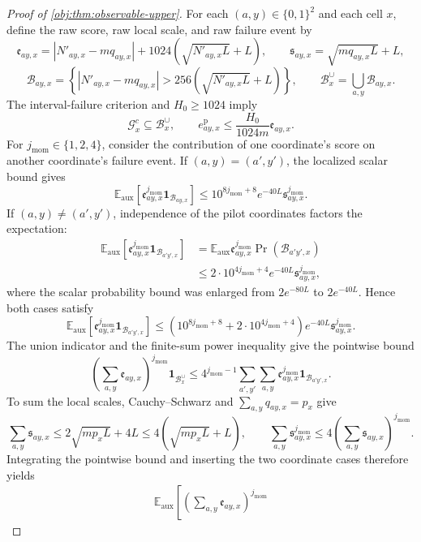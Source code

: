 \begin{proof}[Proof of \cref{obj:thm:observable-upper}]
For each \((a,y)\in\{0,1\}^2\) and each cell \(x\), define the raw score, raw local scale, and raw failure event by
\[
\mathfrak e_{ay,x}
=|N'_{ay,x}-mq_{ay,x}|
+1024\left(\sqrt{N'_{ay,x}L}+L\right),
\qquad
\mathfrak s_{ay,x}=\sqrt{mq_{ay,x}L}+L,
\]
\[
\mathcal B_{ay,x}
=\left\{
|N'_{ay,x}-mq_{ay,x}|>
256\left(\sqrt{N'_{ay,x}L}+L\right)
\right\},
\qquad
\mathcal B_x^{\cup}=\bigcup_{a,y}\mathcal B_{ay,x}.
\]
The interval-failure criterion and \(H_0\ge1024\) imply
\[
\mathcal G_x^c\subseteq\mathcal B_x^{\cup},
\qquad
e_{ay,x}^{\mathrm p}
\le\frac{H_0}{1024m}\mathfrak e_{ay,x}.
\]
For \(j_{\mathrm{mom}}\in\{1,2,4\}\), consider the contribution of one coordinate's score on another coordinate's failure event. If \((a,y)=(a',y')\), the localized scalar bound gives
\[
\mathbb E_{\mathrm{aux}}\!\left[
\mathfrak e_{ay,x}^{j_{\mathrm{mom}}}\mathbf1_{\mathcal B_{ay,x}}
\right]
\le10^{8j_{\mathrm{mom}}+8}e^{-40L}
\mathfrak s_{ay,x}^{j_{\mathrm{mom}}}.
\]
If \((a,y)\ne(a',y')\), independence of the pilot coordinates factors the expectation:
\[
\begin{aligned}
\mathbb E_{\mathrm{aux}}\!\left[
\mathfrak e_{ay,x}^{j_{\mathrm{mom}}}\mathbf1_{\mathcal B_{a'y',x}}
\right]
&=\mathbb E_{\mathrm{aux}}\mathfrak e_{ay,x}^{j_{\mathrm{mom}}}
\Pr(\mathcal B_{a'y',x})\\
&\le2\cdot10^{4j_{\mathrm{mom}}+4}e^{-40L}
\mathfrak s_{ay,x}^{j_{\mathrm{mom}}},
\end{aligned}
\]
where the scalar probability bound was enlarged from \(2e^{-80L}\) to \(2e^{-40L}\). Hence both cases satisfy
\[
\mathbb E_{\mathrm{aux}}\!\left[
\mathfrak e_{ay,x}^{j_{\mathrm{mom}}}\mathbf1_{\mathcal B_{a'y',x}}
\right]
\le
\left(10^{8j_{\mathrm{mom}}+8}+2\cdot10^{4j_{\mathrm{mom}}+4}\right)
e^{-40L}\mathfrak s_{ay,x}^{j_{\mathrm{mom}}}.
\]
The union indicator and the finite-sum power inequality give the pointwise bound
\[
\left(\sum_{a,y}\mathfrak e_{ay,x}\right)^{j_{\mathrm{mom}}}
\mathbf1_{\mathcal B_x^{\cup}}
\le4^{j_{\mathrm{mom}}-1}
\sum_{a',y'}\sum_{a,y}
\mathfrak e_{ay,x}^{j_{\mathrm{mom}}}
\mathbf1_{\mathcal B_{a'y',x}}.
\]
To sum the local scales, Cauchy--Schwarz and \(\sum_{a,y}q_{ay,x}=p_x\) give
\[
\sum_{a,y}\mathfrak s_{ay,x}
\le2\sqrt{mp_xL}+4L
\le4\left(\sqrt{mp_xL}+L\right),
\qquad
\sum_{a,y}\mathfrak s_{ay,x}^{j_{\mathrm{mom}}}
\le4\left(\sum_{a,y}\mathfrak s_{ay,x}\right)^{j_{\mathrm{mom}}}.
\]
Integrating the pointwise bound and inserting the two coordinate cases therefore yields
\[
\begin{aligned}
\mathbb E_{\mathrm{aux}}\!\left[
\left(\sum_{a,y}\mathfrak e_{ay,x}\right)^{j_{\mathrm{mom}}}

\end{aligned}\]
\end{proof}
